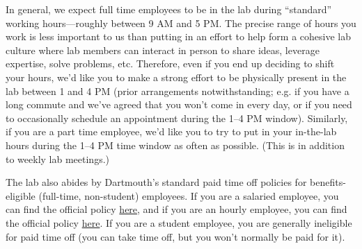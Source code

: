 \documentclass{tufte-book} %
\begin{document}
 \noindent In general, we expect full time employees to be in the lab
 during ``standard'' working hours---roughly between 9 AM and 5
 PM.  The
 precise range of hours you work is less important to us than putting
 in an effort to help form a cohesive lab culture where lab members
 can interact in person to share ideas, leverage expertise, solve
 problems, etc.  Therefore, even if you end up deciding to shift your
 hours, we'd like you to make a strong effort to be physically present
 in the lab between 1 and 4 PM (prior arrangements notwithstanding;
 e.g. if you have a long commute and we've agreed that you won't come
 in every day, or if you need to occasionally schedule an appointment
 during the 1--4 PM window).  Similarly, if you are a part time
 employee, we'd like you to try to put in your in-the-lab hours during
 the 1--4 PM time window as often as possible.  (This is in addition
 to weekly lab meetings.)

 The lab also abides by Dartmouth's standard paid time off policies
 for benefits-eligible (full-time, non-student) employees.  If you are
 a salaried employee, you can find the official policy
 \href{http://www.dartmouth.edu/~hrs/pdfs/paid_time_off_salaried.pdf}{here},
 and if you are an hourly employee, you can find the official policy
 \href{http://www.dartmouth.edu/~hrs/pdfs/Paid_Time_Off_Hourly.pdf}{here}.
 If you are a student employee, you are generally ineligible for paid
 time off (you can take time off, but you won't normally be paid for
 it).
\end{document}

